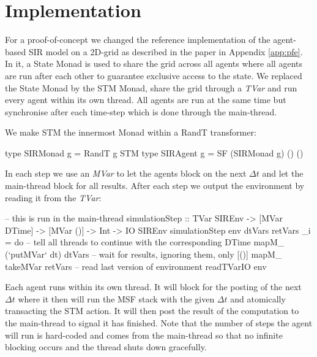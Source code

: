 \section{Implementation}
\label{sect:stm_impl}
For a proof-of-concept we changed the reference implementation of the agent-based SIR model on a 2D-grid as described in the paper in Appendix \ref{app:pfe}. In it, a State Monad is used to share the grid across all agents where all agents are run after each other to guarantee exclusive access to the state. We replaced the State Monad by the STM Monad, share the grid through a \textit{TVar} and run every agent within its own thread. All agents are run at the same time but synchronise after each time-step which is done through the main-thread.

We make STM the innermost Monad within a RandT transformer:
\begin{HaskellCode}
type SIRMonad g   = RandT g STM
type SIRAgent g   = SF (SIRMonad g) () ()
\end{HaskellCode}

In each step we use an \textit{MVar} to let the agents block on the next $\Delta t$ and let the main-thread block for all results. After each step we output the environment by reading it from the \textit{TVar}:
\begin{HaskellCode}
-- this is run in the main-thread
simulationStep :: TVar SIREnv
               -> [MVar DTime]
               -> [MVar ()]
               -> Int
               -> IO SIREnv
simulationStep env dtVars retVars _i = do
  -- tell all threads to continue with the corresponding DTime
  mapM_ (`putMVar` dt) dtVars
  -- wait for results, ignoring them, only [()]
  mapM_ takeMVar retVars
  -- read last version of environment
  readTVarIO env
\end{HaskellCode}

Each agent runs within its own thread. It will block for the posting of the next $\Delta t$ where it then will run the MSF stack with the given $\Delta t$ and atomically transacting the STM action. It will then post the result of the computation to the main-thread to signal it has finished. Note that the number of steps the agent will run is hard-coded and comes from the main-thread so that no infinite blocking occurs and the thread shuts down gracefully.

